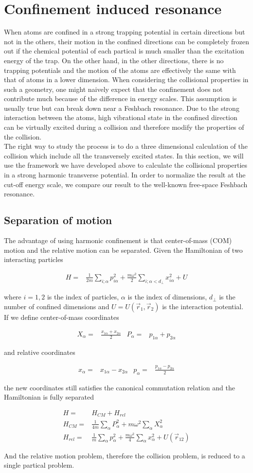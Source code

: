 \documentclass[aps,twocolumn,secnumarabic,balancelastpage,amsmath,amssymb,nofootinbib]{revtex4}
\newcommand{\eqar}[1]
{
  \begin{align*}
    #1
  \end{align*}
}
\newcommand{\paren}[1]{{\left({#1}\right)}}
\begin{document}
\section{Confinement induced resonance}
When atoms are confined in a strong trapping potential in certain directions but not in the others, their motion in the confined directions can be completely frozen out if the chemical potential of each partical is much smaller than the excitation energy of the trap. On the other hand, in the other directions, there is no trapping potentials and the motion of the atoms are effectively the same with that of atoms in a lower dimension. When considering the collisional properties in such a geometry, one might naively expect that the confinement does not contribute much because of the difference in energy scales. This assumption is usually true but can break down near a Feshbach resonance. Due to the strong interaction between the atoms, high vibrational state in the confined direction can be virtually excited during a collision and therefore modify the properties of the collision.\\

The right way to study the process is to do a three dimensional calculation of the collision which include all the transversely excited states. In this section, we will use the framework we have developed above to calculate the collisional properties in a strong harmonic transverse potential. In order to normalize the result at the cut-off energy scale, we compare our result to the well-known free-space Feshbach resonance.

\subsection{Separation of motion}
The advantage of using harmonic confinement is that center-of-mass (COM) motion and the relative motion can be separated. Given the Hamiltonian of two interacting particles
\eqar{
  H=&\frac{1}{2m}\sum_{i;\alpha}p_{i\alpha}^2+\frac{m\omega^2}{2}\sum_{i;\alpha<d_\perp}x_{i\alpha}^2+U
}
where $i=1,2$ is the index of particles, $\alpha$ is the index of dimensions, $d_\perp$ is the number of confined dimensions and $U=U\paren{\vec r_1, \vec r_2}$ is the interaction potential. If we define center-of-mass coordinates
\eqar{
  X_\alpha=&\frac{x_{1\alpha}+x_{2\alpha}}{2}&P_\alpha=&p_{1\alpha}+p_{2\alpha}
}
and relative coordinates
\eqar{
  x_\alpha=&x_{1\alpha}-x_{2\alpha}&p_\alpha=&\frac{p_{1\alpha}-p_{2\alpha}}{2}
}
the new coordinates still satisfies the canonical commutation relation and the Hamiltonian is fully separated
\eqar{
  H=&H_{CM}+H_{rel}\\
  H_{CM}=&\frac{1}{4m}\sum_\alpha P_\alpha^2+m\omega^2\sum_\alpha X_\alpha^2\\
  H_{rel}=&\frac{1}{m}\sum_\alpha p_\alpha^2+\frac{m\omega^2}{4}\sum_\alpha x_\alpha^2+U\paren{\vec r_{12}}
}
And the relative motion problem, therefore the collision problem, is reduced to a single partical problem.
\end{document}

